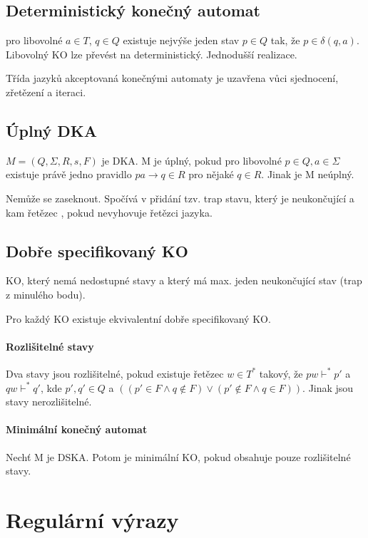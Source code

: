 \documentclass[a4wide]{report}
\begin{document}
\subsection{Deterministický konečný automat}

pro libovolné $a \in T$, $q \in Q$ existuje nejvýše jeden stav $p \in Q$ tak, že $p \in \delta(q,a)$. Libovolný KO lze převést na deterministický. Jednodušší realizace.

Třída jazyků akceptovaná konečnými automaty je uzavřena vůci sjednocení, zřetězení a iteraci.

\subsection{Úplný DKA}

$M = (Q, \Sigma, R, s, F)$ je DKA. M je úplný, pokud pro libovolné $p \in Q, a \in \Sigma$ existuje právě jedno pravidlo $pa \to q \in R$ pro nějaké $q \in R$. Jinak je M neúplný.

Nemůže se zaseknout. Spočívá v přidání tzv. trap stavu, který je neukončující a kam řetězec , pokud nevyhovuje řetězci jazyka.

\subsection{Dobře specifikovaný KO}

KO, který nemá nedostupné stavy a který má max. jeden neukončující stav (trap z minulého bodu).

Pro každý KO existuje ekvivalentní dobře specifikovaný KO.

\paragraph{Rozlišitelné stavy}
Dva stavy jsou rozlišitelné, pokud existuje řetězec $w \in T^*$ takový, že $pw \vdash^* p'$ a $qw \vdash^* q'$, kde $p', q' \in Q$ a $((p' \in F \land q \notin F) \lor (p' \notin F \land q \in F))$. Jinak jsou stavy nerozlišitelné.

\paragraph{Minimální konečný automat}
Nechť M je DSKA. Potom je minimální KO, pokud obsahuje pouze rozlišitelné stavy.



\section{Regulární výrazy}
\end{document}
